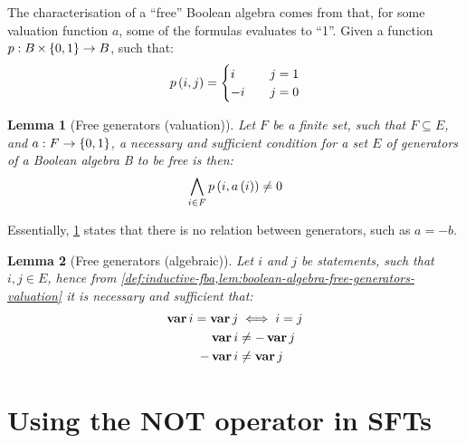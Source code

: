 \documentclass[12pt,openright,twoside,a4paper,oldfontcommands,english,brazil,draft]{abntex2}
\theoremstyle{theo}
\newtheorem{Lem}{Lemma}[chapter]
\def\varop{\ensuremath\operatorname{\mathbf{var}}}
\newcommand{\var}[1]{\ensuremath\varop #1}
\newcommand{\setsin}[1]{\ensuremath\left\{ #1 \right\}}
\newcommand{\parsin}[1]{\ensuremath\left( #1 \right)}
\def\cartesian{\ensuremath\operatorname{\times}}
\begin{document}
The characterisation of a ``free'' Boolean algebra comes from that, for some valuation function $a$, some of the formulas evaluates to ``1''.
Given a function $p:B \cartesian \setsin{0,1} \rightarrow B$, such that:
%
\begin{equation}
p\parsin{i,j} =
\begin{cases}
  i & \quad j = 1\\
  -i & \quad j = 0
\end{cases}
\end{equation}

\begin{Lem}[Free generators (valuation)]
\label{lem:boolean-algebra-free-generators-valuation}
Let $F$ be a finite set, such that $F \subseteq E$, and $a: F \rightarrow \setsin{0,1}$, a necessary and sufficient condition for a set $E$ of generators of a Boolean algebra B to be free is then:
%
\begin{equation}
\bigwedge_{i \in F} p\parsin{i, a \parsin{i}} \neq 0
\end{equation}
\end{Lem}


Essentially, \cref{lem:boolean-algebra-free-generators-valuation} states that there is no relation between generators, such as $a = -b$.

\begin{Lem}[Free generators (algebraic)]
Let $i$ and $j$ be statements, such that $i,j \in E$, hence from \cref{def:inductive-fba,lem:boolean-algebra-free-generators-valuation} it is necessary and sufficient that:
%
\begin{subequations}
\begin{align}
\var i = \var j & \iff i = j\\
\var i & \neq - \var j\\
-\var i & \neq \var j
\end{align}
\end{subequations}
%
\end{Lem}
%

\section[Using the NOT operator in static fault trees]{Using the \ac{NOT} operator in \aclp*{SFT}}
\label{sec:not-operator}
\end{document}
